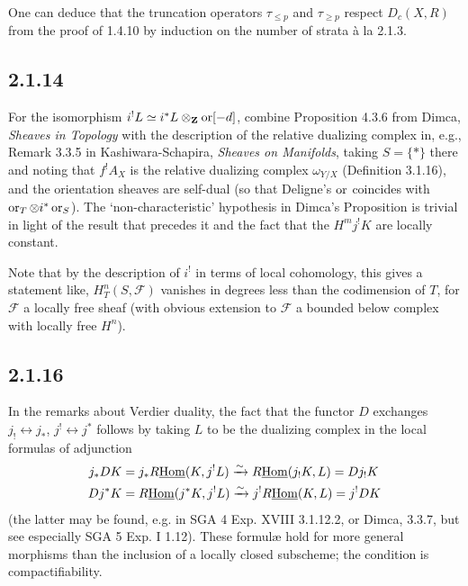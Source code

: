 \documentclass[deligne.tex]{subfiles}
\begin{document}
	One can deduce that the truncation operators $\tau_{\leq p}$ and
	$\tau_{\geq p}$ respect $D_c(X,R)$ from the proof of 
	1.4.10 by induction on the number of strata à la 2.1.3.
	
	\subsection*{2.1.14} For the isomorphism $i^!L\simeq i^*L\otimes_{\mathbf{Z}}\operatorname{or}[-d]$,
	combine Proposition 4.3.6 from Dimca, \emph{Sheaves in Topology} with
	the description of the relative dualizing complex in, e.g.,
	Remark 3.3.5 in Kashiwara-Schapira, \emph{Sheaves on Manifolds}, taking
	$S=\{\ast\}$ there and noting
	that $f^!A_X$ is the relative dualizing complex $\omega_{Y/X}$
	(Definition 3.1.16), and the orientation sheaves are self-dual
	(so that Deligne's $\operatorname{or}$ coincides with $\operatorname{or}_T\otimes i^*\operatorname{or}_S$).
	The `non-characteristic' hypothesis in Dimca's Proposition is trivial
	in light of the result that precedes it and the fact that the
	$H^mj^!K$ are locally constant.
	
	Note that by the description of $i^!$ in terms of local cohomology,
	this gives a statement like, $H^n_T(S,\mathcal F)$ vanishes in degrees
	less than the codimension of $T$, for $\mathcal F$ a locally free sheaf
	(with obvious extension to $\mathcal F$ a bounded below
	complex with locally free $H^n$).
	
	\subsection*{2.1.16}
	In the remarks about Verdier duality, the fact that the functor $D$
	exchanges $j_!\leftrightarrow j_*$, $j^!\leftrightarrow j^*$ follows by 
	taking $L$ to be the dualizing complex in the local formulas of adjunction
	\begin{align*}
		j_*DK&=j_*R\underline{\operatorname{Hom}}(K,j^!L)\xrightarrow{\sim}
		R\underline{\operatorname{Hom}}(j_!K,L)=Dj_!K \\
		Dj^*K&=R\underline{\operatorname{Hom}}(j^*K,j^!L)\xrightarrow{\sim}
		j^!R\underline{\operatorname{Hom}}(K,L)=j^!DK
	\end{align*}
	(the latter may be found, e.g. in SGA 4 Exp. XVIII 3.1.12.2,
	or Dimca, 3.3.7, but see especially SGA 5 Exp. I 1.12).
	These formulæ hold for more general morphisms than the inclusion of a locally closed subscheme; the condition is compactifiability.
\end{document}
